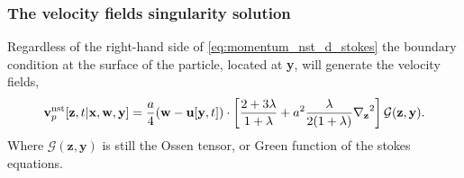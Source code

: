 \subsubsection{The velocity fields singularity solution}

Regardless of the right-hand side of \ref{eq:momentum_nst_d_stokes} the boundary condition at the surface of the particle, located at \textbf{y}, will generate the velocity fields\citep{pozrikidis1992boundary}, 
\begin{equation}
    \textbf{v}^\text{nst}_p[\textbf{z},t|\textbf{x},\textbf{w},\textbf{y}]
    = 
    \frac{a}{4}(\textbf{w}- \textbf{u}[\textbf{y},t])\cdot\left[
        \frac{2+3\lambda}{1+\lambda}
        +
        a^2\frac{\lambda}{2(1+\lambda)}\pddz^2 
    \right]\mathcal{G}(\textbf{z},\textbf{y}).
    \label{eq:solution_isolated2}
\end{equation}
Where $\mathcal{G}(\textbf{z},\textbf{y})$ is still the Ossen tensor, or Green function of the stokes equations. 

